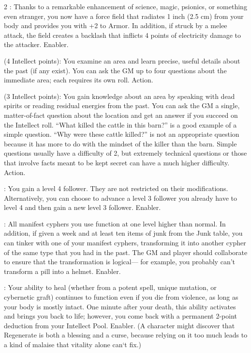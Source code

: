 \begin{multicols}{2}
: Thanks to a remarkable enhancement of science, magic, psionics, or something even stranger, you now have a force field that radiates 1 inch (2.5 cm) from your body and provides you with +2 to Armor. In addition, if struck by a melee attack, the field creates a backlash that inflicts 4 points of electricity damage to the attacker. Enabler. 
 
 (4 Intellect points): You examine an area and learn precise, useful details about the past (if any exist). You can ask the GM up to four questions about the immediate area; each requires its own roll. Action. 
 
 (3 Intellect points): You gain knowledge about an area by speaking with dead spirits or reading residual energies from the past. You can ask the GM a single, matter-of-fact question about the location and get an answer if you succeed on the Intellect roll. “What killed the cattle in this barn?” is a good example of a simple question. “Why were these cattle killed?” is not an appropriate question because it has more to do with the mindset of the killer than the barn. Simple questions usually have a difficulty of 2, but extremely technical questions or those that involve facts meant to be kept secret can have a much higher difficulty. Action. 
 
: You gain a level 4 follower. They are not restricted on their modifications. Alternatively, you can choose to advance a level 3 follower you already have to level 4 and then gain a new level 3 follower. Enabler. 
 
: All manifest cyphers you use function at one level higher than normal. In addition, if given a week and at least ten items of junk from the Junk table, you can tinker with one of your manifest cyphers, transforming it into another cypher of the same type that you had in the past. The GM and player should collaborate to ensure that the transformation is logical— for example, you probably can’t transform a pill into a helmet. Enabler.
 
: Your ability to heal (whether from a potent spell, unique mutation, or cybernetic graft) continues to function even if you die from violence, as long as your body is mostly intact. One minute after your death, this ability activates and brings you back to life; however, you come back with a permanent 2-point deduction from your Intellect Pool. Enabler. (A character might discover that Regenerate is both a blessing and a curse, because relying on it too much leads to a kind of malaise that vitality alone can‘t fix.)
 

\end{multicols}
